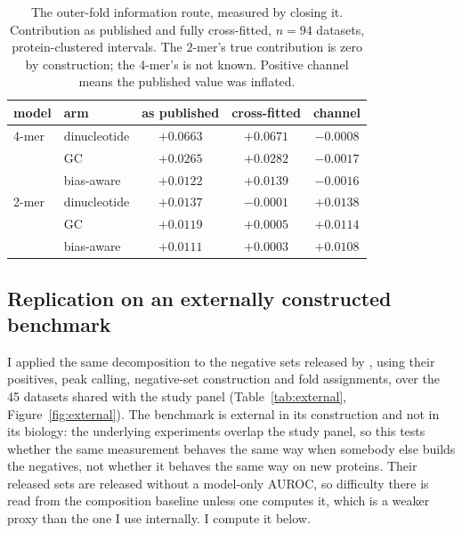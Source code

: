 \begin{table}[htbp]
\centering
\caption{The outer-fold information route, measured by closing it. Contribution as published and
fully cross-fitted, $n=94$ datasets, protein-clustered intervals. The 2-mer's true contribution
is zero by construction; the 4-mer's is not known. Positive channel means the published value
was inflated.}
\label{tab:crossfit}
\begin{tabular}{llccc}
\toprule
model & arm & as published & cross-fitted & channel \\
\midrule
4-mer & dinucleotide & $+0.0663$ & $+0.0671$ & $-0.0008$ \\
      & GC           & $+0.0265$ & $+0.0282$ & $-0.0017$ \\
      & bias-aware   & $+0.0122$ & $+0.0139$ & $-0.0016$ \\
\midrule
2-mer & dinucleotide & $+0.0137$ & $-0.0001$ & $+0.0138$ \\
      & GC           & $+0.0119$ & $+0.0005$ & $+0.0114$ \\
      & bias-aware   & $+0.0111$ & $+0.0003$ & $+0.0108$ \\
\bottomrule
\end{tabular}
\end{table}

\subsection{Replication on an externally constructed benchmark}
\label{sec:replication45}

I applied the same decomposition to the negative sets released by \citet{horlacher2023}, using
their positives, peak calling, negative-set construction and fold assignments, over the 45
datasets shared with the study panel (Table~\ref{tab:external}, Figure~\ref{fig:external}). The
benchmark is external in its construction and not in its biology: the underlying experiments
overlap the study panel, so this tests whether the same measurement behaves the same way when somebody
else builds the negatives, not whether it behaves the same way on new proteins. Their released
sets are released without a model-only AUROC, so difficulty there is read from the composition
baseline unless one computes it, which is a weaker proxy than the one I use internally. I
compute it below.

